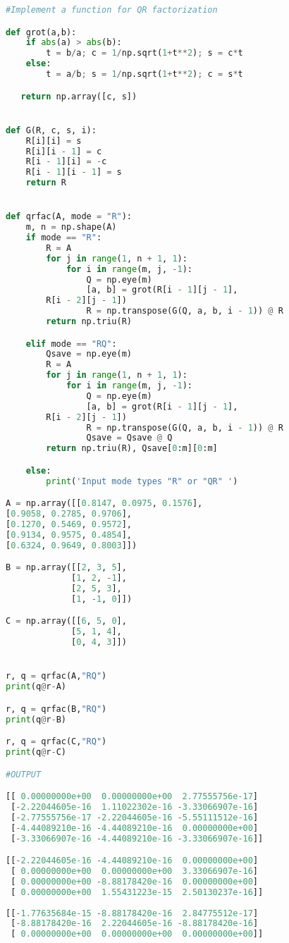 \documentclass[a4paper]{article}
\begin{document}
\begin{lstlisting}[language=Python]
#Implement a function for QR factorization

def grot(a,b):
    if abs(a) > abs(b):
        t = b/a; c = 1/np.sqrt(1+t**2); s = c*t
    else:
        t = a/b; s = 1/np.sqrt(1+t**2); c = s*t

   return np.array([c, s])


def G(R, c, s, i):
    R[i][i] = s
    R[i][i - 1] = c
    R[i - 1][i] = -c
    R[i - 1][i - 1] = s
    return R


def qrfac(A, mode = "R"):
    m, n = np.shape(A)
    if mode == "R":
        R = A
        for j in range(1, n + 1, 1):
            for i in range(m, j, -1):
                Q = np.eye(m)
                [a, b] = grot(R[i - 1][j - 1],
		R[i - 2][j - 1])
                R = np.transpose(G(Q, a, b, i - 1)) @ R
        return np.triu(R)

    elif mode == "RQ":
        Qsave = np.eye(m)
        R = A
        for j in range(1, n + 1, 1):
            for i in range(m, j, -1):
                Q = np.eye(m)
                [a, b] = grot(R[i - 1][j - 1],
		R[i - 2][j - 1])
                R = np.transpose(G(Q, a, b, i - 1)) @ R
                Qsave = Qsave @ Q
        return np.triu(R), Qsave[0:m][0:m]

    else:
        print('Input mode types "R" or "QR" ')

A = np.array([[0.8147, 0.0975, 0.1576],
[0.9058, 0.2785, 0.9706],
[0.1270, 0.5469, 0.9572],
[0.9134, 0.9575, 0.4854],
[0.6324, 0.9649, 0.8003]])

B = np.array([[2, 3, 5],
             [1, 2, -1],
             [2, 5, 3],
             [1, -1, 0]])

C = np.array([[6, 5, 0],
             [5, 1, 4],
             [0, 4, 3]])


r, q = qrfac(A,"RQ")
print(q@r-A)

r, q = qrfac(B,"RQ")
print(q@r-B)

r, q = qrfac(C,"RQ")
print(q@r-C)

#OUTPUT

[[ 0.00000000e+00  0.00000000e+00  2.77555756e-17]
 [-2.22044605e-16  1.11022302e-16 -3.33066907e-16]
 [-2.77555756e-17 -2.22044605e-16 -5.55111512e-16]
 [-4.44089210e-16 -4.44089210e-16  0.00000000e+00]
 [-3.33066907e-16 -4.44089210e-16 -3.33066907e-16]]

[[-2.22044605e-16 -4.44089210e-16  0.00000000e+00]
 [ 0.00000000e+00  0.00000000e+00  3.33066907e-16]
 [ 0.00000000e+00 -8.88178420e-16  0.00000000e+00]
 [ 0.00000000e+00  1.55431223e-15  2.50130237e-16]]
 
[[-1.77635684e-15 -8.88178420e-16  2.84775512e-17]
 [-8.88178420e-16  2.22044605e-16 -8.88178420e-16]
 [ 0.00000000e+00  0.00000000e+00  0.00000000e+00]]





\end{lstlisting}
\end{document}
